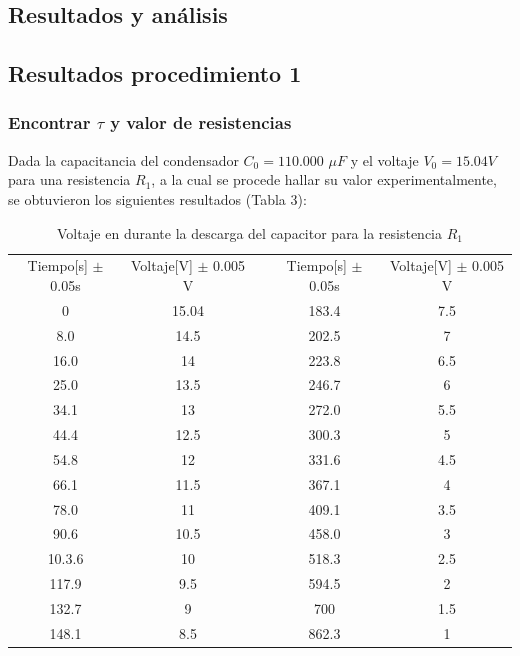 \documentclass[10pt,letter]{article}
\begin{document}
\begin{multicols}{2}
\section{Resultados y análisis}

\subsection{Resultados procedimiento 1}

\subsubsection{Encontrar $\tau$ y valor de resistencias}

Dada la capacitancia del condensador $C_0=110.000$ $\mu F$ y el voltaje $V_0=15.04V$ para una resistencia $R_1$, a la cual se procede hallar su valor experimentalmente, se obtuvieron los siguientes resultados (Tabla 3):

\end{multicols}

\begin{table}[H]
\centering
\begin{tabular}{|c|c|c|c|c|}
\cline{1-2} \cline{4-5}
Tiempo[s] $\pm$ 0.05s & Voltaje[V] $\pm$ 0.005 V &  & Tiempo[s] $\pm$ 0.05s & Voltaje[V] $\pm$ 0.005 V \\ \cline{1-2} \cline{4-5} 
0 & 15.04 &  & 183.4 & 7.5 \\ \cline{1-2} \cline{4-5} 
8.0 & 14.5 &  & 202.5 & 7 \\ \cline{1-2} \cline{4-5} 
16.0 & 14 &  & 223.8 & 6.5 \\ \cline{1-2} \cline{4-5} 
25.0 & 13.5 &  & 246.7 & 6 \\ \cline{1-2} \cline{4-5} 
34.1 & 13 &  & 272.0 & 5.5 \\ \cline{1-2} \cline{4-5} 
44.4 & 12.5 &  & 300.3 & 5 \\ \cline{1-2} \cline{4-5} 
54.8 & 12 &  & 331.6 & 4.5 \\ \cline{1-2} \cline{4-5} 
66.1 & 11.5 &  & 367.1 & 4 \\ \cline{1-2} \cline{4-5} 
78.0 & 11 &  & 409.1 & 3.5 \\ \cline{1-2} \cline{4-5} 
90.6 & 10.5 &  & 458.0 & 3 \\ \cline{1-2} \cline{4-5} 
10.3.6 & 10 &  & 518.3 & 2.5 \\ \cline{1-2} \cline{4-5} 
117.9 & 9.5 &  & 594.5 & 2 \\ \cline{1-2} \cline{4-5} 
132.7 & 9 &  & 700 & 1.5 \\ \cline{1-2} \cline{4-5} 
148.1 & 8.5 &  & 862.3 & 1 \\ \cline{1-2} \cline{4-5} 
\end{tabular}
\caption{Voltaje en durante la descarga del capacitor para la resistencia $R_1$}
\end{table}
\end{document}
